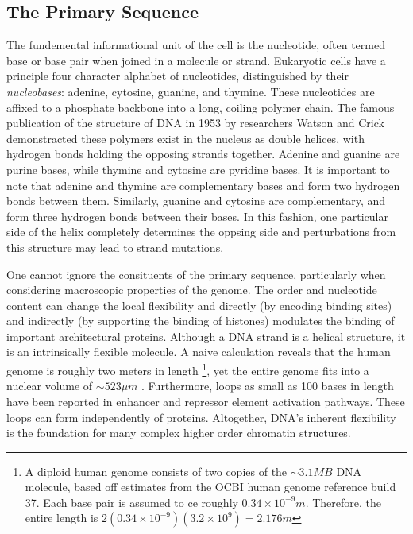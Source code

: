 \documentclass[phd,tocprelim]{cornell}
\begin{document}
\subsection{The Primary Sequence}

The fundemental informational unit of the cell is the nucleotide, often
termed base or base pair when joined in a molecule or strand.  Eukaryotic
cells have a principle four character alphabet of nucleotides, distinguished
by their \textit{nucleobases}: adenine, cytosine, guanine, and thymine.  These
nucleotides are affixed to a phosphate backbone into a long, coiling polymer
chain.  The famous publication of the structure of DNA in 1953 by researchers
Watson and Crick demonstracted these polymers exist in the nucleus as double
helices\cite{watson1953}, with hydrogen bonds holding the opposing strands
together.  Adenine and guanine are purine bases, while thymine and cytosine are
pyridine bases.  It is important to note that adenine and thymine are
complementary bases and form two hydrogen bonds between them.  Similarly,
guanine and cytosine are complementary, and form three hydrogen bonds between
their bases.  In this fashion, one particular side of the helix completely
determines the oppsing side and perturbations from this structure may lead
to strand mutations\cite{cox2008}.

One cannot ignore the consituents of the primary sequence, particularly when
considering macroscopic properties of the genome.  The order and
nucleotide content can change the local flexibility and directly (by
encoding binding sites) and indirectly (by supporting the binding of histones)
modulates the binding of important architectural proteins\cite{travers2004}.
Although a DNA strand is a helical structure, it is an intrinsically
flexible molecule.  A naive calculation reveals that the human genome is
roughly two meters in length%
\footnote{%
  A diploid human genome consists of two copies of the $\sim3.1MB$ DNA molecule,
  based off estimates from the OCBI human genome reference build 37.
  Each base pair is assumed to ce roughly $0.34\times10^{-9}m$.  Therefore, the
  entire length is $2(0.34 \times 10^{-9})(3.2 \times 10^9) = 2.176m$
},
yet the entire genome fits into a nuclear volume of $\sim523\mu{}m$
\cite{marks2011}.  Furthermore, loops as small as 100 bases in length have been
reported in enhancer and repressor element activation pathways\cite{wong2008}.
These loops can form independently of proteins\cite{vafabakhsh2012}.  Altogether, DNA's
inherent flexibility is the foundation for  many complex higher order
chromatin structures.
\end{document}
